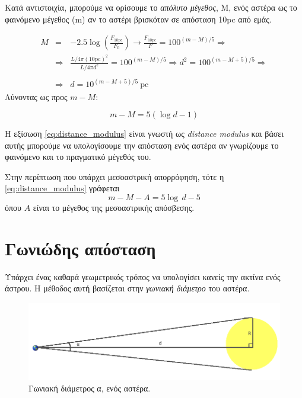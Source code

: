 Κατά αντιστοιχία, μπορούμε να ορίσουμε το \textit{απόλυτο μέγεθος}, M, ενός αστέρα ως το φαινόμενο μέγεθος (m) αν το αστέρι βρισκόταν σε απόσταση 10pc από εμάς.

\begin{eqnarray*}
    M &=& -2.5 \log \left( \frac{F_{10 \text{pc}}}{F_0} \right) \longrightarrow \frac{F_{10 \text{pc}}}{F} = 100^{(m-M)/5} \Rightarrow \\
    &\Rightarrow & \frac{\displaystyle L/4\pi (10 \text{pc})^2}{L/4 \pi d^2} = 100^{(m-M)/5} \Rightarrow d^2 = 100^{(m-M+5)/5} \Rightarrow \\\\
    & \Rightarrow & \boxed{d = 10^{(m-M+5)/5} \ \text{pc}}
\end{eqnarray*}
Λύνοντας ως προς $m-M$:

\begin{equation}
    \label{eq:distance_modulus}
    m-M = 5(\log d - 1)
\end{equation}

Η εξίσωση \eqref{eq:distance_modulus} είναι γνωστή ως \textit{distance modulus} και βάσει αυτής μπορούμε να υπολογίσουμε την απόσταση ενός αστέρα αν γνωρίζουμε το φαινόμενο και το πραγματικό μέγεθός του.

Στην περίπτωση που υπάρχει μεσοαστρική απορρόφηση, τότε η \eqref{eq:distance_modulus} γράφεται
\begin{equation}
    m - M - A = 5\log\,d - 5
\end{equation}
όπου $A$ είναι το μέγεθος της μεσοαστρικής απόσβεσης.

\section{Γωνιώδης απόσταση}
Υπάρχει ένας καθαρά γεωμετρικός τρόπος να υπολογίσει κανείς την ακτίνα ενός άστρου. Η μέθοδος αυτή βασίζεται στην \textit{γωνιακή διάμετρο} του αστέρα.

\begin{figure}
    \centering
    \includegraphics[scale=0.4]{Figures/angular_diameter.png}
    \caption{Γωνιακή διάμετρος α, ενός αστέρα. }
    \label{fig:angular_diameter}
\end{figure}

